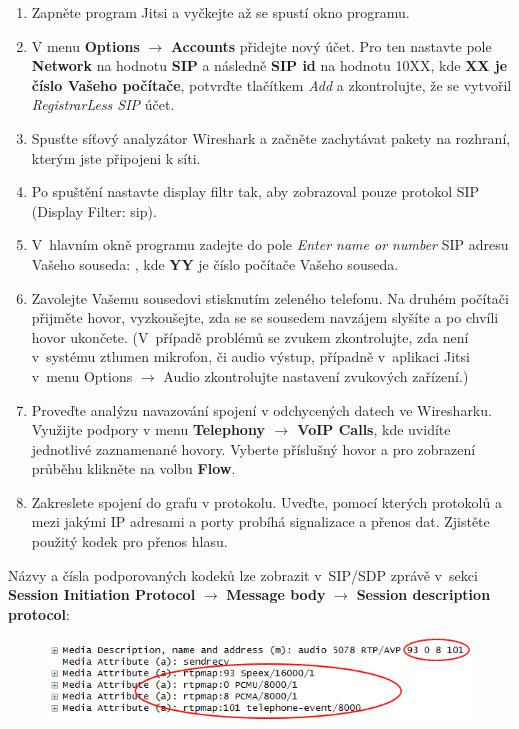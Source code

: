 \begin{enumerate}
    \item Zapněte program Jitsi a vyčkejte až se spustí okno programu.
    \item V menu {\bf Options} $\rightarrow$ {\bf Accounts} přidejte nový účet. Pro ten nastavte pole {\bf Network} na hodnotu {\bf SIP} a následně {\bf SIP id} na hodnotu 10XX, kde {\bf XX je číslo Vašeho počítače}, potvrďte tlačítkem {\it Add} a zkontrolujte, že se vytvořil {\it RegistrarLess SIP} účet.
    \item Spusťte síťový analyzátor Wireshark a začněte zachytávat pakety na rozhraní, kterým jste připojeni k síti.
    \item Po spuštění nastavte display filtr tak, aby zobrazoval pouze protokol
      SIP (Display Filter: sip).
    \item V hlavním okně programu zadejte do pole {\it Enter name or number} SIP adresu Vašeho souseda: , kde {\bf YY} je číslo počítače Vašeho souseda.
    \item Zavolejte Vašemu sousedovi stisknutím zeleného telefonu. Na druhém počítači přijměte hovor, vyzkoušejte, zda se se sousedem navzájem slyšíte a po chvíli hovor ukončete.
(V případě problémů se zvukem zkontrolujte, zda není v systému ztlumen mikrofon, či audio výstup, případně v aplikaci Jitsi v menu Options $\rightarrow$ Audio zkontrolujte nastavení zvukových zařízení.) 
    \item Proveďte analýzu navazování spojení v odchycených datech ve Wiresharku. Využijte podpory v menu {\bf Telephony $\rightarrow$ VoIP Calls}, kde uvidíte jednotlivé zaznamenané hovory. Vyberte příslušný hovor a pro zobrazení průběhu klikněte na volbu {\bf Flow}.
    \item Zakreslete spojení do grafu v protokolu. Uveďte, pomocí kterých protokolů a mezi jakými IP adresami a porty probíhá signalizace a přenos dat. Zjistěte použitý kodek pro přenos hlasu.
\end{enumerate}
Názvy a čísla podporovaných kodeků lze zobrazit v SIP/SDP zprávě v sekci {\bf Session Initiation Protocol} $\rightarrow$ {\bf Message body} $\rightarrow$ {\bf Session description protocol}:
\begin{figure}[h!]
  \centering
  \includegraphics[width=145mm]{img/3a.png}
\end{figure}

